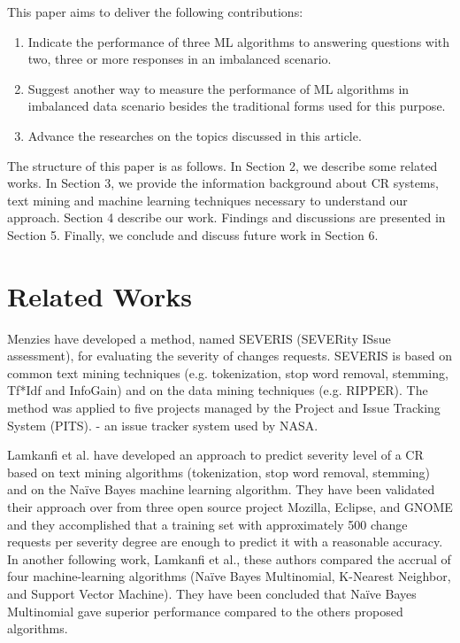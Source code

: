 \documentclass[10pt, conference]{IEEEtran}
\begin{document}
This paper aims to deliver the following contributions: 

\begin{enumerate}
  \item Indicate the performance of three ML algorithms to answering questions with two, three or more responses in an imbalanced scenario.  
  \item Suggest another way to measure the performance of ML algorithms in imbalanced data scenario besides the traditional forms used for this purpose.
  \item Advance the researches on the topics discussed in this article.
\end{enumerate}

The structure of this paper is as follows. In Section 2, we describe some related works. In Section 3, we provide the information background about CR systems, text mining and machine learning techniques necessary to understand our approach. Section 4 describe our work. Findings and discussions are presented in Section 5. Finally, we conclude and discuss future work in Section 6.


\section{Related Works}

Menzies\cite{Menzies2008} have developed a method, named SEVERIS (SEVERity ISsue assessment), for evaluating the severity of changes requests. SEVERIS is based on common text mining techniques (e.g. tokenization, stop word removal, stemming, Tf*Idf and InfoGain) and on the data mining techniques (e.g. RIPPER). The method was applied to five projects managed by the Project and Issue Tracking System (PITS). - an issue tracker system used by NASA.

Lamkanfi et al.\cite{Lamkanfi2010} have developed an approach to predict severity level of a CR based on text mining algorithms (tokenization, stop word removal, stemming) and on the Naïve Bayes machine learning algorithm. They have been validated their approach over from three open source project Mozilla, Eclipse, and GNOME and they accomplished that a training set with approximately 500 change requests per severity degree are enough to predict it with a reasonable accuracy. In another following work, Lamkanfi et al.\cite{Lamkanfi2011}, these authors compared the accrual of four machine-learning algorithms (Naïve Bayes Multinomial, K-Nearest Neighbor, and Support Vector Machine). They have been concluded that Naïve Bayes Multinomial gave superior performance compared to the others proposed algorithms.
\end{document}
